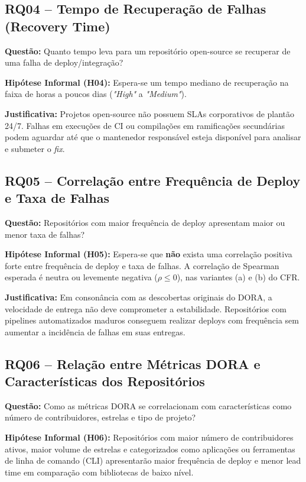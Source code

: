 \documentclass[12pt]{article}
\begin{document}
\subsection{RQ04 -- Tempo de Recuperação de Falhas (Recovery Time)}
\textbf{Questão:} Quanto tempo leva para um repositório open-source se recuperar de uma falha de deploy/integração?

\textbf{Hipótese Informal (H04):} Espera-se um tempo mediano de recuperação na faixa de horas a poucos dias (\textit{"High"} a \textit{"Medium"}).

\textbf{Justificativa:} Projetos open-source não possuem SLAs corporativos de plantão 24/7. Falhas em execuções de CI ou compilações em ramificações secundárias podem aguardar até que o mantenedor responsável esteja disponível para analisar e submeter o \textit{fix}.

\subsection{RQ05 -- Correlação entre Frequência de Deploy e Taxa de Falhas}
\textbf{Questão:} Repositórios com maior frequência de deploy apresentam maior ou menor taxa de falhas?

\textbf{Hipótese Informal (H05):} Espera-se que \textbf{não} exista uma correlação positiva forte entre frequência de deploy e taxa de falhas. A correlação de Spearman esperada é neutra ou levemente negativa ($\rho \le 0$), nas variantes (a) e (b) do CFR.

\textbf{Justificativa:} Em consonância com as descobertas originais do DORA, a velocidade de entrega não deve comprometer a estabilidade. Repositórios com pipelines automatizados maduros conseguem realizar deploys com frequência sem aumentar a incidência de falhas em suas entregas.

\subsection{RQ06 -- Relação entre Métricas DORA e Características dos Repositórios}
\textbf{Questão:} Como as métricas DORA se correlacionam com características como número de contribuidores, estrelas e tipo de projeto?

\textbf{Hipótese Informal (H06):} Repositórios com maior número de contribuidores ativos, maior volume de estrelas e categorizados como aplicações ou ferramentas de linha de comando (CLI) apresentarão maior frequência de deploy e menor lead time em comparação com bibliotecas de baixo nível.
\end{document}
